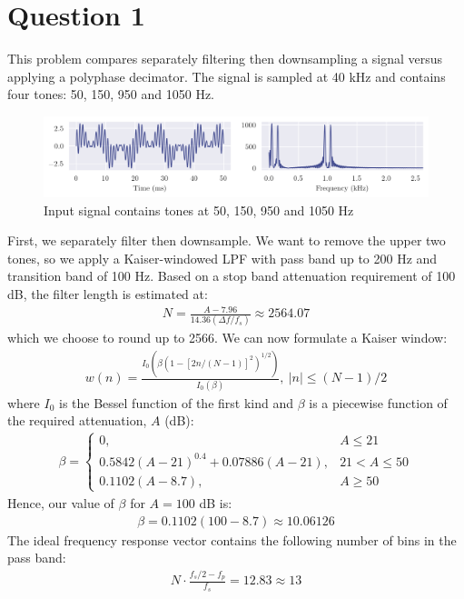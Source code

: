 \section*{Question 1}

This problem compares separately filtering then downsampling a signal versus applying a polyphase decimator. The signal is sampled at 40 kHz and contains four tones: 50, 150, 950 and 1050 Hz.

\begin{figure}[ht]
    \centering
    \includegraphics[width=\textwidth]{images/q1_signal.png}
    \caption{Input signal contains tones at 50, 150, 950 and 1050 Hz}
    \label{fig:q1_signal}
\end{figure}

First, we separately filter then downsample. We want to remove the upper two tones, so we apply a Kaiser-windowed LPF with pass band up to 200 Hz and transition band of 100 Hz. Based on a stop band attenuation requirement of 100 dB, the filter length is estimated at:
\begin{align}
    N = \frac{A - 7.96}{14.36(\Delta f/f_s)} \approx 2564.07
\end{align}
which we choose to round up to 2566. We can now formulate a Kaiser window:
\begin{align}
    w(n) = \frac{I_0(\beta(1 - [2n/(N-1)]^2)^{1/2})}{I_0(\beta)},\ |n| \leq (N-1)/2
\end{align}
where $I_0$ is the Bessel function of the first kind and $\beta$ is a piecewise function of the required attenuation, $A$ (dB):
\begin{align}
    \beta = \begin{cases}
        0,                                      & A \leq 21 \\
        0.5842(A - 21)^{0.4} + 0.07886(A - 21), & 21 < A \leq 50 \\
        0.1102(A - 8.7),                        & A \geq 50
    \end{cases}
\end{align}
Hence, our value of $\beta$ for $A=100$ dB is:
\begin{align}
    \beta = 0.1102(100 - 8.7) \approx 10.06126
\end{align}
The ideal frequency response vector contains the following number of bins in the pass band:
\begin{align}
    N \cdot \frac{f_s/2 - f_p}{f_s} = 12.83 \approx 13
\end{align}

